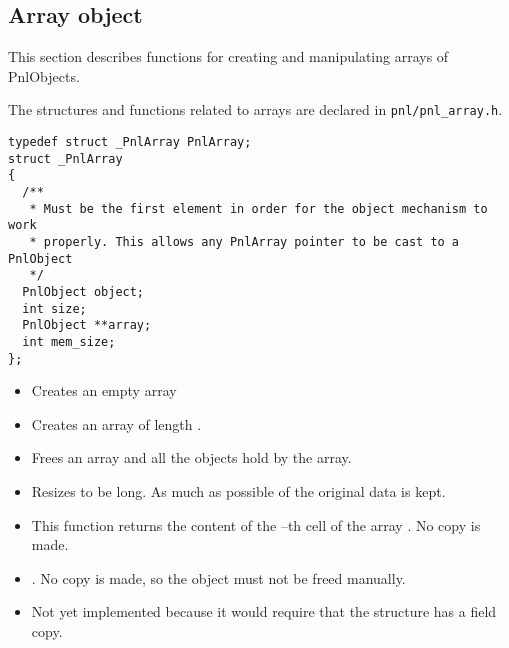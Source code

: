 \subsection{Array object}

This section describes functions for creating and manipulating arrays of
PnlObjects.

The structures and functions related to arrays are declared in
\verb!pnl/pnl_array.h!.

\begin{verbatim}
typedef struct _PnlArray PnlArray;
struct _PnlArray
{
  /**
   * Must be the first element in order for the object mechanism to work
   * properly. This allows any PnlArray pointer to be cast to a PnlObject
   */
  PnlObject object; 
  int size;
  PnlObject **array;
  int mem_size;
};
\end{verbatim}

\begin{itemize}
\item {}
  \sshortdescribe Creates an empty array
\item {}
  \sshortdescribe Creates an array of length .
\item {}
  \sshortdescribe Frees an array and all the objects hold by the array.
\item {}
  \sshortdescribe Resizes  to be  long. As much as possible of
  the original data is kept.
\item {}
  \sshortdescribe This function returns the content of the --th cell of
  the array . No copy is made.
\item {}
  \sshortdescribe {}. No copy is made, so the object  must
  not be freed manually.
\item {}
  \sshortdescribe Not yet implemented because it would require that the
  structure  has a field copy.
\end{itemize}


